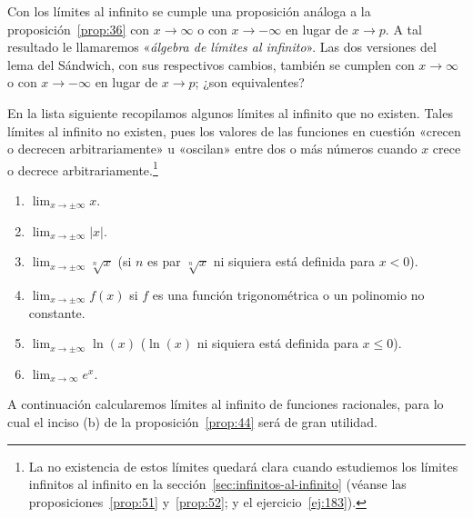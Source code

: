 \documentclass[12pt,a4paper]{book}
\begin{document}
    \begin{observacion}\label{obs:13}
        Con los límites al infinito se cumple una proposición análoga
        a la proposición~\ref{prop:36} con $x\to\infty$ o con $x\to-\infty$ en lugar de $x\to p$. A
        tal resultado le llamaremos «\textit{álgebra de límites al infinito}». Las dos versiones
        del lema del Sándwich, con sus respectivos cambios, también se cumplen con
        $x\to\infty$ o con $x\to-\infty$ en lugar de $x\to p$; ¿son equivalentes?
    \end{observacion}

    \begin{observacion}\label{obs:14}
        En la
        lista siguiente recopilamos algunos límites al infinito que no existen. Tales
        límites al infinito no existen, pues los valores de las funciones en cuestión
        «crecen o decrecen arbitrariamente» u «oscilan» entre dos o más números
        cuando $x$ crece o decrece arbitrariamente.\footnote{La no existencia de estos límites quedará clara cuando estudiemos los límites infinitos
        al infinito en la sección~\ref{sec:infinitos-al-infinito} (véanse las proposiciones~\ref{prop:51} y~\ref{prop:52}; y el ejercicio~\ref{ej:183}).}
        \begin{enumerate}[nosep]
            \item $\displaystyle\lim_{x\to\pm\infty}x$.
            \item $\displaystyle\lim_{x\to\pm\infty}|x|$.
            \item $\displaystyle\lim_{x\to\pm\infty}\sqrt[n]{x}$ (si $n$ es par $\sqrt[n]{x}$ ni siquiera está definida para $x<0$).
            \item $\displaystyle\lim_{x\to\pm\infty}f(x)$ si $f$ es una función trigonométrica o un polinomio no constante.
            \item $\displaystyle\lim_{x\to\pm\infty}\ln(x)$ ($\ln(x)$ ni siquiera está definida para $x\leq 0$).
            \item $\displaystyle\lim_{x\to\infty}e^{x}$.
        \end{enumerate}
    \end{observacion}

    A continuación calcularemos límites al infinito de funciones racionales,
    para lo cual el inciso (b) de la proposición~\ref{prop:44} será de gran utilidad.
\end{document}
